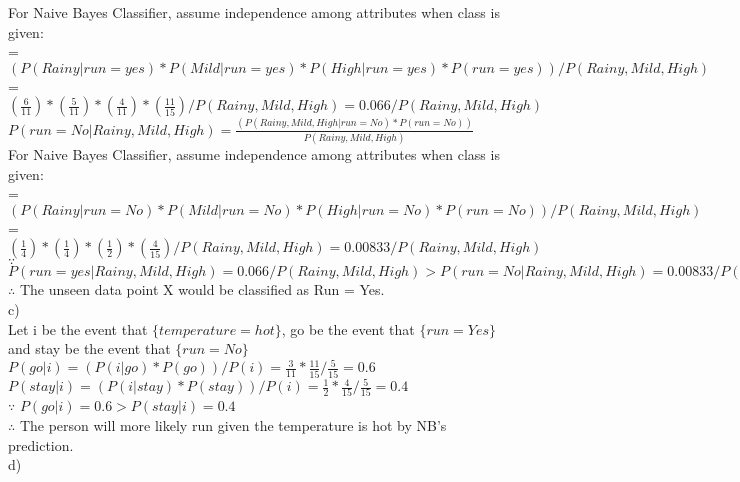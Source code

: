 \documentclass[12pt]{article}
\begin{document}
For Naive Bayes Classifier, assume independence among attributes when class is given:\\

= $(P(Rainy|run=yes)*P(Mild|run=yes)*P(High|run=yes)*P(run=yes))/P(Rainy,Mild,High)$\\

= $(\frac{6}{11})*(\frac{5}{11})*(\frac{4}{11})*(\frac{11}{15})/P(Rainy,Mild,High) = 0.066/P(Rainy,Mild,High)$\\

$P(run=No|Rainy,Mild,High) = \frac{(P(Rainy,Mild,High|run=No)*P(run=No))}{P(Rainy,Mild,High)}$\\

For Naive Bayes Classifier, assume independence among attributes when class is given:\\

= $(P(Rainy|run=No)*P(Mild|run=No)*
P(High|run=No)*P(run=No))/P(Rainy,Mild,High)$\\

= $(\frac{1}{4})*(\frac{1}{4})*(\frac{1}{2})*(\frac{4}{15})/P(Rainy,Mild,High) = 0.00833/P(Rainy,Mild,High)$\\

$\because$ $P(run=yes|Rainy,Mild,High) = 0.066/P(Rainy,Mild,High) > P(run=No|Rainy,Mild,High) = 0.00833/P(Rainy,Mild,High)$\\

$\therefore$ The unseen data point X would be classified as Run = Yes.\\

c)\\

Let i be the event that $\{temperature = hot\}$, go be the event that $\{run = Yes\}$ and stay be the event that $\{run = No\}$\\

$P(go|i) = (P(i|go)*P(go))/P(i) = \frac{3}{11}*\frac{11}{15}/\frac{5}{15} = 0.6$\\

$P(stay|i) = (P(i|stay)*P(stay))/P(i) = \frac{1}{2}*\frac{4}{15}/\frac{5}{15} = 0.4$\\

$\because$ $P(go|i) = 0.6 > P(stay|i) = 0.4$\\

$\therefore$ The person will more likely run given the temperature is hot by NB's prediction.\\

d)\\
\end{document}
